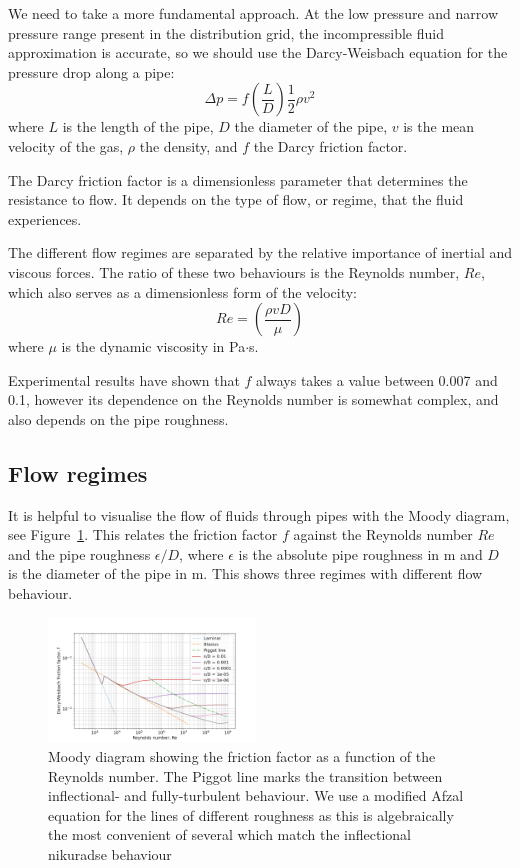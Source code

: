 \documentclass[5p]{elsarticle} %
\begin{document}
We need to take a more fundamental approach.
At the low pressure and narrow pressure range present in the distribution grid, the incompressible fluid approximation is accurate\citep{Perry2008}, so we should use the
Darcy-Weisbach equation for the pressure drop along a pipe:
\begin{equation}
\label{eqn:darcywiesbach}
\Delta p = f \left( \frac{L}{D} \right) \frac{1}{2} \rho v^2
\end{equation}
where $L$ is the length of the pipe,  $D$ the diameter of the pipe,  $v$ is the mean velocity of the gas, $\rho$ the density, and $f$ the Darcy friction factor.

The Darcy friction factor is a dimensionless parameter that determines the resistance to flow. 
It depends on the type of flow, or regime, that the fluid experiences.

The different flow regimes are separated by the relative importance of inertial and viscous forces.
The ratio of these two behaviours is the Reynolds number, $Re$, which also serves as a dimensionless form of the velocity:
\begin{equation}
\label{eqn:re}
Re =  \left ( \frac{\rho v D}{\mu}\right )
\end{equation}
where $\mu$ is the dynamic viscosity in Pa$\cdot$s.

Experimental results have shown that $f$ always takes a value between 0.007 and 0.1, however its dependence on the Reynolds number is somewhat complex\citep{Allen2007}, and also depends on the pipe roughness.

\subsection{Flow regimes}

It is helpful to visualise the flow of fluids through pipes with the Moody diagram, see Figure~\ref{fig:moody}. 
This relates the friction factor $f$ against the Reynolds number $Re$ and the pipe roughness $\epsilon/D$, where $\epsilon$ is the absolute pipe roughness in m and $D$ is the diameter of the pipe in m. 
This shows three regimes with different flow behaviour.

\begin{figure}[ht]
\centering
\includegraphics[width=0.49\textwidth]{moody_afzal.png}
\caption{Moody diagram showing the friction factor as a function of the Reynolds number. The Piggot line
marks the transition between inflectional- and fully-turbulent behaviour\citep{Moody1944}. We use a modified Afzal equation\citep{Cerbus2018}  for the lines of different roughness as this is algebraically the most convenient of several which match the inflectional nikuradse behaviour\citep{Allen2007,Goldenfeld2006}}
\label{fig:moody}
\end{figure}
\end{document}
